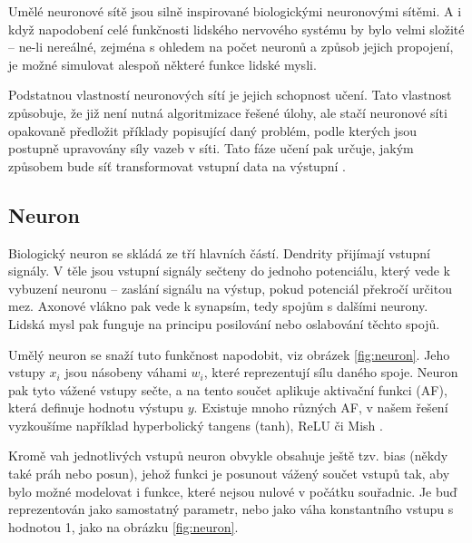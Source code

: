 Umělé neuronové sítě jsou silně inspirované biologickými neuronovými sítěmi. A
i když napodobení celé funkčnosti lidského nervového systému by bylo velmi
složité – ne-li nereálné, zejména s ohledem na počet neuronů a způsob jejich
propojení, je možné simulovat alespoň některé funkce lidské mysli.


Podstatnou vlastností neuronových sítí je jejich schopnost učení. Tato
vlastnost způsobuje, že již není nutná algoritmizace řešené úlohy, ale stačí
neuronové síti opakovaně předložit příklady popisující daný problém, podle
kterých jsou postupně upravovány síly vazeb v síti. Tato fáze učení pak určuje,
jakým způsobem bude síť transformovat vstupní data na výstupní
\cite{Vondrak1994}.

\subsection{Neuron}
Biologický neuron se skládá ze tří hlavních částí. Dendrity přijímají vstupní
signály. V těle jsou vstupní signály sečteny do jednoho potenciálu, který vede
k vybuzení neuronu – zaslání signálu na výstup, pokud potenciál překročí
určitou mez. Axonové vlákno pak vede k synapsím, tedy spojům s dalšími neurony.
Lidská mysl pak funguje na principu posilování nebo oslabování těchto spojů.

Umělý neuron se snaží tuto funkčnost napodobit, viz obrázek \ref{fig:neuron}.
Jeho vstupy $x_i$ jsou násobeny váhami $w_i$, které reprezentují sílu daného
spoje. Neuron pak tyto vážené vstupy sečte, a na tento součet aplikuje
aktivační funkci (AF), která definuje hodnotu výstupu $y$. Existuje mnoho
různých AF, v našem řešení vyzkoušíme například hyperbolický tangens (tanh),
ReLU či Mish \cite{afreview}.

Kromě vah jednotlivých vstupů neuron obvykle obsahuje ještě tzv. bias (někdy
také práh nebo posun), jehož funkci je posunout vážený součet vstupů tak, aby
bylo možné modelovat i funkce, které nejsou nulové v počátku souřadnic. Je buď
reprezentován jako samostatný parametr, nebo jako váha konstantního vstupu s
hodnotou 1, jako na obrázku \ref{fig:neuron}.

